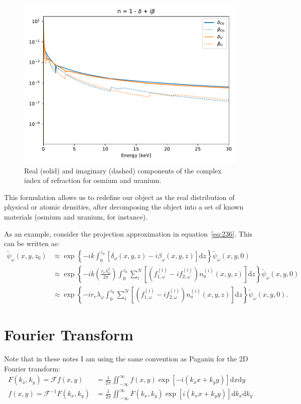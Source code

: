 \documentclass{article}
\begin{document}
\begin{figure}[h]
  \centering
  \includegraphics[width=0.6\linewidth]{figs/refindex}
  \captionsetup{width=0.6\linewidth}
  \caption{Real (solid) and imaginary (dashed) components of the complex
    index of refraction for osmium and uranium.}
  \label{fig:refindex}
\end{figure}

This formulation allows us to redefine our object as the real distribution of
physical or atomic densities, after decomposing the object into a set of known
materials (osmium and uranium, for instance).

As an example, consider the projection approximation in
equation~\ref{eq:236}. This can be written as:
\begin{align}
  \tilde{\psi}_{\omega}(x,y,z_0) &\approx \exp\left\{-ik\int_0^{z_0} \left[\delta_{\omega}(x,y,z) - i\beta_{\omega}(x,y,z)\right] \mathrm{d}z\right\}\tilde{\psi}_{\omega}(x,y,0)\nonumber\\
                                 &\approx \exp\left\{-ik\left(\frac{r_e\lambda_{\omega}^2}{2\pi}\right)\int_0^{z_0} \sum_i^N \left[\left(f_{1,\omega}^{(i)} - if_{2,\omega}^{(i)}\right)n_a^{(i)}(x,y,z)\right] \mathrm{d}z\right\}\tilde{\psi}_{\omega}(x,y,0)\nonumber\\
                                 &\approx \exp\left\{-i r_e \lambda_{\omega}\int_0^{z_0} \sum_i^N \left[\left(f_{1,\omega}^{(i)} - if_{2,\omega}^{(i)}\right)n_a^{(i)}(x,y,z)\right] \mathrm{d}z\right\}\tilde{\psi}_{\omega}(x,y,0).
\end{align}

\section{Fourier Transform}\label{Fourier}
Note that in these notes I am using the same convention as Paganin for the
2D Fourier transform:
\begin{align}
  F(k_x,k_y) = \mathcal{F}f(x,y) &= \frac{1}{2\pi}\iint_{-\infty}^{\infty} f(x, y)\exp\left[-i(k_x x + k_y y)\right] \mathrm{d}x \mathrm{d}y\\
  f(x,y) = \mathcal{F}^{-1}F(k_x, k_y) &= \frac{1}{2\pi}\iint_{-\infty}^{\infty} F(k_x, k_y)\exp\left[i(k_x x + k_y y)\right] \mathrm{d}k_x \mathrm{d}k_y
\end{align}



\end{document}
